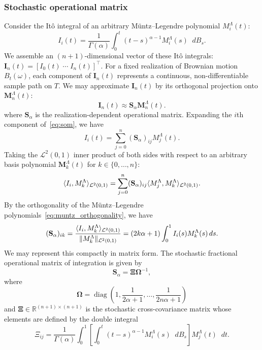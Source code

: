 \documentclass[11pt, a4paper]{article}
\theoremstyle{theoremstyle}
\theoremstyle{definitionstyle}
\newcommand{\dd}{\mathop{}\!d}
\DeclareMathOperator{\diag}{diag}
\DeclarePairedDelimiter{\norm}{\lVert}{\rVert}
\DeclarePairedDelimiter{\ip}{\langle}{\rangle}
\begin{document}
\subsubsection{Stochastic operational matrix}
Consider the It\^o integral of an arbitrary M\"untz--Legendre polynomial $M_i^\Lambda(t)$:
\begin{equation}
    I_i(t) = \frac 1{\Gamma(\alpha)} \int_0^t (t - s)^{\alpha - 1} M_i^\Lambda(s)\dd{B_s}.
\end{equation}
We assemble an $(n+1)$-dimensional vector of these It\^o integrals: $\mathbf I_n(t) = [I_0(t) \; \cdots \; I_n(t)]^\top$. For a fixed realization of Brownian motion $B_t(\omega)$, each component of $\mathbf I_n(t)$ represents a continuous, non-differentiable sample path on $T$. We may approximate $\mathbf I_n(t)$ by its orthogonal projection onto $\mathbf M_n^\Lambda(t)$:
\begin{equation}\label{eq:som}
    \mathbf I_n(t) \approx \mathbf S_\alpha\mathbf M_n^\Lambda(t).
\end{equation}
where $\mathbf S_\alpha$ is the realization-dependent operational matrix. Expanding the $i$th component of~\eqref{eq:som}, we have
\begin{equation}
    I_i(t) = \sum_{j=0}^n (\mathbf S_\alpha)_{ij} M_j^\Lambda(t).
\end{equation}
Taking the $\mathcal L^2(0, 1)$ inner product of both sides with respect to an arbitrary basis polynomial $\mathbf M_k^\Lambda(t)$ for $k \in \{0, \dots , n\}$:
\begin{equation}
    \ip{I_i, M_k^\Lambda}_{\mathcal L^2(0, 1)} = \sum_{j=0}^n (\mathbf S_\alpha)_{ij} \ip{M_j^\Lambda, M_k^\Lambda}_{\mathcal L^2(0, 1)}.
\end{equation}
By the orthogonality of the M\"untz--Legendre polynomials~\eqref{eq:muntz_orthogonality}, we have
\begin{equation}
      (\mathbf S_\alpha)_{ik} = \frac{\ip{I_i, M_k^\Lambda}_{\mathcal L^2(0, 1)}}{\norm{M_k^\Lambda}_{\mathcal L^2(0, 1)}} = (2k\alpha+1)\int_0^1 I_i(s)M_k^\Lambda(s)\dd{s}.
\end{equation}
We may represent this compactly in matrix form. The stochastic fractional operational matrix of integration is given by
\begin{equation}
    \mathbf S_\alpha = \boldsymbol \Xi \boldsymbol \Omega^{-1},
\end{equation}
where
\begin{equation}
    \boldsymbol \Omega = \diag \left (1, \frac{1}{2\alpha + 1}, \dots, \frac{1}{2n\alpha + 1} \right )
\end{equation}
and $\boldsymbol \Xi \in \mathbb R^{(n+1)\times(n+1)}$ is the stochastic cross-covariance matrix whose elements are defined by the double integral
\begin{equation}\label{eq:xi}
    \Xi_{ij} = \frac 1{\Gamma(\alpha)} \int_0^1 \left [ \int_0^t (t - s)^{\alpha - 1}M_i^\Lambda(s)\dd{B_s} \right ] M_j^\Lambda(t) \dd{t}.
\end{equation}
\end{document}
